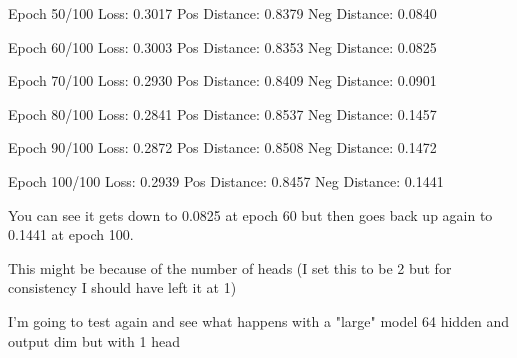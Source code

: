 Epoch 50/100
  Loss: 0.3017
  Pos Distance: 0.8379
  Neg Distance: 0.0840

Epoch 60/100
  Loss: 0.3003
  Pos Distance: 0.8353
  Neg Distance: 0.0825

Epoch 70/100
  Loss: 0.2930
  Pos Distance: 0.8409
  Neg Distance: 0.0901

Epoch 80/100
  Loss: 0.2841
  Pos Distance: 0.8537
  Neg Distance: 0.1457

Epoch 90/100
  Loss: 0.2872
  Pos Distance: 0.8508
  Neg Distance: 0.1472

Epoch 100/100
  Loss: 0.2939
  Pos Distance: 0.8457
  Neg Distance: 0.1441
  
You can see it gets down to 0.0825 at epoch 60 but then goes back up again to 0.1441 at epoch 100.

This might be because of the number of heads (I set this to be 2 but for consistency I should have left it at 1)

I'm going to test again and see what happens with a "large" model 64 hidden and output dim but with 1 head